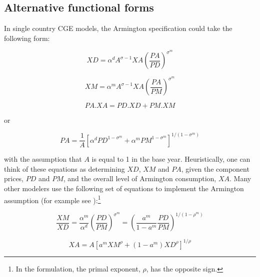 \subsection{Alternative functional forms}

In single country CGE models, the Armington specification could take the following form:

\begin{displaymath}
\mathit{XD}={{\alpha }^{d}}{{A}^{\sigma -1}}\mathit{XA}
			{{\left( \frac{\mathit{PA}}{\mathit{PD}} \right)}^{{{\sigma}^{m}}}}
\end{displaymath}

\begin{displaymath}
\mathit{XM}={{\alpha }^{m}}{{A}^{\sigma -1}}\mathit{XA}
			{{\left( \frac{\mathit{PA}}{\mathit{PM}} \right)}^{{{\sigma}^{m}}}}
\end{displaymath}

\begin{displaymath}
\mathit{PA}.\mathit{XA}=\mathit{PD}.\mathit{XD}+\mathit{PM}.\mathit{XM}
\end{displaymath}

\noindent or

\begin{displaymath}
\mathit{PA}={\frac{1}{A}}
{\left[ \alpha^d \mathit{PD^{1-\sigma^m}}
		+ \alpha^m \mathit{PM^{1-\sigma^m}} \right]}^{1/(1-\sigma^m)}
\end{displaymath}

\noindent with the assumption that $A$ is equal to 1 in the base year. Heuristically, one can think
of these equations as determining $\mathit{XD}$, $\mathit{XM}$ and $\mathit{PA}$, given  the
component prices, $\mathit{PD}$ and $\mathit{PM}$, and the overall level of Armington consumption,
$\mathit{XA}$. Many other modelers use the following set of equations to implement the Armington
assumption (for example see \cite{Lofgrenetal2013}):\footnote{In the \cite{Lofgrenetal2013}
formulation, the primal exponent, $\rho$, has the opposite sign.}

\begin{displaymath}
\frac{\mathit{XM}}{\mathit{XD}}=\frac{{{\alpha }^{m}}}
{{{\alpha }^{d}}}{{\left( \frac{\mathit{PD}}{\mathit{PM}}
\right)}^{{{\sigma }^{m}}}}={{\left( \frac{{{a}^{m}}}
{1-{{a}^{m}}}\frac{\mathit{PD}}{\mathit{PM}}
\right)}^{1/(1-{{\rho }^{m}})}}
\end{displaymath}

\begin{displaymath}
\mathit{XA}=A{{\left[ {{a}^{m}}\mathit{XM^{\rho}}+
(1-{{a}^{m}})\mathit{XD^{\rho}} \right]}^{1/\rho
}}
\end{displaymath}


